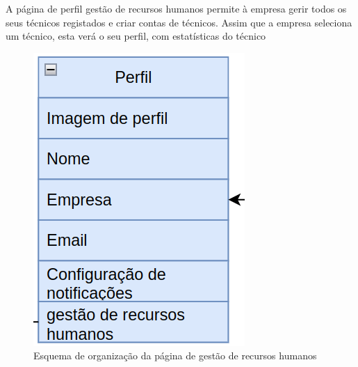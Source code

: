 A página de perfil gestão de recursos humanos permite à empresa gerir todos os seus técnicos registados 
e criar contas de técnicos. Assim que a empresa seleciona um técnico, esta verá o seu perfil, 
com estatísticas do técnico
\begin{figure}[htb]
    \centering
    
    \includegraphics[height=0.35\textwidth]{images/Arquiteturas/superficial_de_app/perfil.png}
    \caption{Esquema de organização da página de gestão de recursos humanos}
    \label{fig:10}
\end{figure}